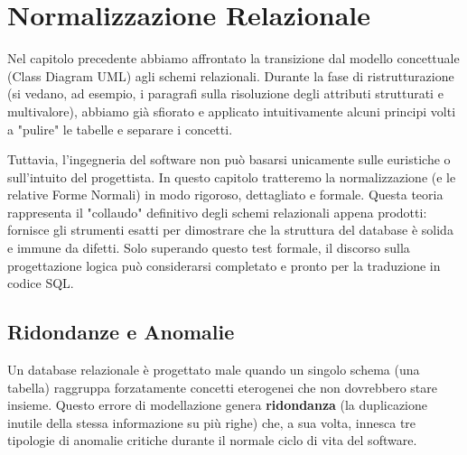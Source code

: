 \chapter{Normalizzazione Relazionale}

Nel capitolo precedente abbiamo affrontato la transizione dal modello concettuale (Class Diagram UML) agli schemi relazionali. Durante la fase di ristrutturazione (si vedano, ad esempio, i paragrafi sulla risoluzione degli attributi strutturati e multivalore), abbiamo già sfiorato e applicato intuitivamente alcuni principi volti a "pulire" le tabelle e separare i concetti. 

Tuttavia, l'ingegneria del software non può basarsi unicamente sulle euristiche o sull'intuito del progettista. In questo capitolo tratteremo la normalizzazione (e le relative Forme Normali) in modo rigoroso, dettagliato e formale. Questa teoria rappresenta il "collaudo" definitivo degli schemi relazionali appena prodotti: fornisce gli strumenti esatti per dimostrare che la struttura del database è solida e immune da difetti. Solo superando questo test formale, il discorso sulla progettazione logica può considerarsi completato e pronto per la traduzione in codice SQL.

\section{Ridondanze e Anomalie}

Un database relazionale è progettato male quando un singolo schema (una tabella) raggruppa forzatamente concetti eterogenei che non dovrebbero stare insieme. Questo errore di modellazione genera \textbf{ridondanza} (la duplicazione inutile della stessa informazione su più righe) che, a sua volta, innesca tre tipologie di anomalie critiche durante il normale ciclo di vita del software.

